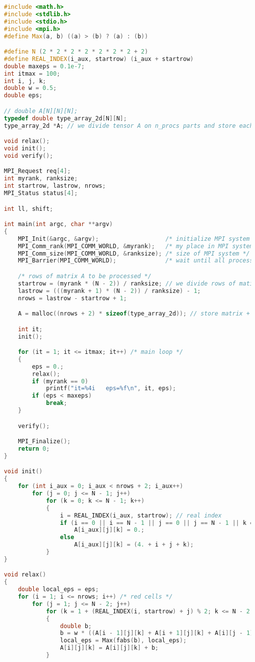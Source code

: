 \begin{lstlisting}[language=c++]
#include <math.h>
#include <stdlib.h>
#include <stdio.h>
#include <mpi.h>
#define Max(a, b) ((a) > (b) ? (a) : (b))

#define N (2 * 2 * 2 * 2 * 2 * 2 * 2 + 2)
#define REAL_INDEX(i_aux, startrow) (i_aux + startrow)
double maxeps = 0.1e-7;
int itmax = 100;
int i, j, k;
double w = 0.5;
double eps;

// double A[N][N][N];
typedef double type_array_2d[N][N];
type_array_2d *A; // we divide tensor A on n_procs parts and store each part in corresponding process

void relax();
void init();
void verify();

MPI_Request req[4];
int myrank, ranksize;
int startrow, lastrow, nrows;
MPI_Status status[4];

int ll, shift;

int main(int argc, char **argv)
{
	MPI_Init(&argc, &argv);					  /* initialize MPI system */
	MPI_Comm_rank(MPI_COMM_WORLD, &myrank);	  /* my place in MPI system */
	MPI_Comm_size(MPI_COMM_WORLD, &ranksize); /* size of MPI system */
	MPI_Barrier(MPI_COMM_WORLD);			  /* wait until all processes will be created */

	/* rows of matrix A to be processed */
	startrow = (myrank * (N - 2)) / ranksize; // we divide rows of matix A between processes. Indexation starts from real row of matrix A
	lastrow = (((myrank + 1) * (N - 2)) / ranksize) - 1;
	nrows = lastrow - startrow + 1;

	A = malloc((nrows + 2) * sizeof(type_array_2d)); // store matrix + upper and lower aux borders + left and right borders

	int it;
	init();

	for (it = 1; it <= itmax; it++) /* main loop */
	{
		eps = 0.;
		relax();
		if (myrank == 0)
			printf("it=%4i   eps=%f\n", it, eps);
		if (eps < maxeps)
			break;
	}

	verify();

	MPI_Finalize();
	return 0;
}

void init()
{
	for (int i_aux = 0; i_aux < nrows + 2; i_aux++)
		for (j = 0; j <= N - 1; j++)
			for (k = 0; k <= N - 1; k++)
			{
				i = REAL_INDEX(i_aux, startrow); // real index
				if (i == 0 || i == N - 1 || j == 0 || j == N - 1 || k == 0 || k == N - 1)
					A[i_aux][j][k] = 0.;
				else
					A[i_aux][j][k] = (4. + i + j + k);
			}
}

void relax()
{
	double local_eps = eps;
	for (i = 1; i <= nrows; i++) /* red cells */
		for (j = 1; j <= N - 2; j++)
			for (k = 1 + (REAL_INDEX(i, startrow) + j) % 2; k <= N - 2; k += 2)
			{
				double b;
				b = w * ((A[i - 1][j][k] + A[i + 1][j][k] + A[i][j - 1][k] + A[i][j + 1][k] + A[i][j][k - 1] + A[i][j][k + 1]) / 6. - A[i][j][k]);
				local_eps = Max(fabs(b), local_eps);
				A[i][j][k] = A[i][j][k] + b;
			}


\end{lstlisting}
